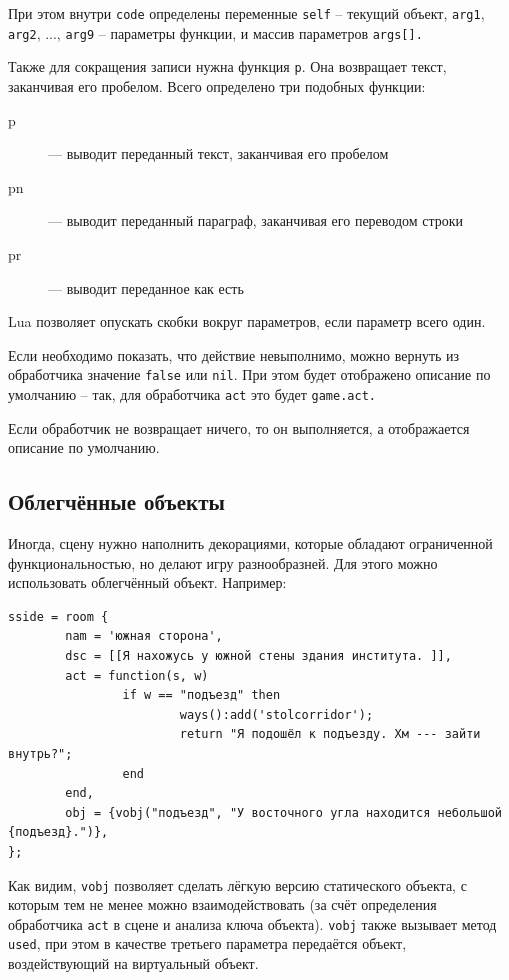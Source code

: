 \documentclass[a4paper,12pt]{article}
\begin{document}
При этом внутри \verb/code/ определены переменные \verb/self/ -- текущий объект, \verb/arg1/, \verb/arg2/, ..., \verb/arg9/ -- параметры функции, и массив параметров \verb/args[]./

Также для сокращения записи нужна функция \verb/p/. Она возвращает текст, заканчивая его пробелом. Всего определено три подобных функции:

\begin{description}
\item[p] --- выводит переданный текст, заканчивая его пробелом
\item[pn] --- выводит переданный параграф, заканчивая его переводом строки
\item[pr] --- выводит переданное как есть
\end{description}

Lua позволяет опускать скобки вокруг параметров, если параметр всего один.

Если необходимо показать, что действие невыполнимо, можно вернуть из обработчика значение \verb/false/ или \verb/nil/. При этом будет отображено описание по умолчанию -- так, для обработчика \verb/act/ это будет  \verb`game.act.`

Если обработчик не возвращает ничего, то он выполняется, а отображается описание по умолчанию.

\subsection{Облегчённые объекты}

Иногда, сцену нужно наполнить декорациями, которые обладают ограниченной функциональностью, но делают игру разнообразней. Для этого можно использовать облегчённый объект. Например:

\begin{verbatim}
sside = room {
        nam = 'южная сторона',
        dsc = [[Я нахожусь у южной стены здания института. ]],
        act = function(s, w)
                if w == "подъезд" then
                        ways():add('stolcorridor');
                        return "Я подошёл к подъезду. Хм --- зайти внутрь?";
                end
        end,
        obj = {vobj("подъезд", "У восточного угла находится небольшой {подъезд}.")},
};
\end{verbatim}

Как видим, \verb/vobj/ позволяет сделать лёгкую версию статического объекта, с которым тем не менее можно взаимодействовать (за счёт определения обработчика \verb/act/ в сцене и анализа ключа объекта). \verb/vobj/ также вызывает метод \verb/used/, при этом в качестве третьего параметра передаётся объект, воздействующий на виртуальный объект.
\end{document}
